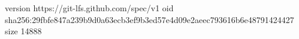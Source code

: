 version https://git-lfs.github.com/spec/v1
oid sha256:29fbfe847a239b9d0a63ecb3ef9b3ed57e4d09e2aeec793616b6e48791424427
size 14888

